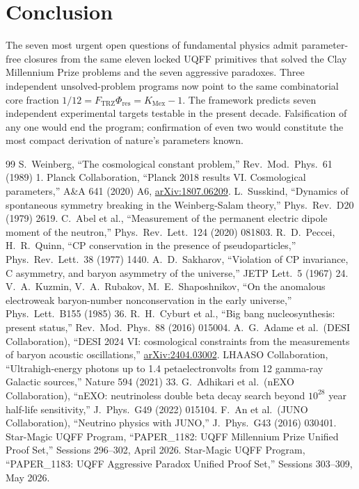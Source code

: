 \documentclass[11pt]{article}
\newcommand{\Ftrz}{F_{\mathrm{TRZ}}}
\newcommand{\Phires}{\Phi_{\mathrm{res}}}
\newcommand{\KMex}{K_{\mathrm{Mex}}}
\begin{document}
\section{Conclusion}

The seven most urgent open questions of fundamental physics admit
parameter-free closures from the same eleven locked UQFF primitives
that solved the Clay Millennium Prize problems and the seven
aggressive paradoxes. Three independent unsolved-problem programs
now point to the same combinatorial core fraction $1/12=\Ftrz\Phires=\KMex-1$.
The framework predicts seven independent experimental targets
testable in the present decade. Falsification of any one would end
the program; confirmation of even two would constitute the most
compact derivation of nature's parameters known.

\begin{thebibliography}{99}
 S.\ Weinberg, ``The cosmological constant problem,'' Rev.\ Mod.\ Phys.\ 61 (1989) 1.
 Planck Collaboration, ``Planck 2018 results VI. Cosmological parameters,'' A\&A 641 (2020) A6, \href{https://arxiv.org/abs/1807.06209}{arXiv:1807.06209}.
 L.\ Susskind, ``Dynamics of spontaneous symmetry breaking in the Weinberg-Salam theory,'' Phys.\ Rev.\ D20 (1979) 2619.
 C.\ Abel et al., ``Measurement of the permanent electric dipole moment of the neutron,'' Phys.\ Rev.\ Lett.\ 124 (2020) 081803.
 R.~D.~Peccei, H.~R.~Quinn, ``CP conservation in the presence of pseudoparticles,'' Phys.\ Rev.\ Lett.\ 38 (1977) 1440.
 A.\ D.\ Sakharov, ``Violation of CP invariance, C asymmetry, and baryon asymmetry of the universe,'' JETP Lett.\ 5 (1967) 24.
 V.~A.~Kuzmin, V.~A.~Rubakov, M.~E.~Shaposhnikov, ``On the anomalous electroweak baryon-number nonconservation in the early universe,'' Phys.\ Lett.\ B155 (1985) 36.
 R.~H.~Cyburt et al., ``Big bang nucleosynthesis: present status,'' Rev.\ Mod.\ Phys.\ 88 (2016) 015004.
 A.~G.~Adame et al.\ (DESI Collaboration), ``DESI 2024 VI: cosmological constraints from the measurements of baryon acoustic oscillations,'' \href{https://arxiv.org/abs/2404.03002}{arXiv:2404.03002}.
 LHAASO Collaboration, ``Ultrahigh-energy photons up to 1.4 petaelectronvolts from 12 gamma-ray Galactic sources,'' Nature 594 (2021) 33.
 G.\ Adhikari et al.\ (nEXO Collaboration), ``nEXO: neutrinoless double beta decay search beyond $10^{28}$ year half-life sensitivity,'' J.\ Phys.\ G49 (2022) 015104.
 F.\ An et al.\ (JUNO Collaboration), ``Neutrino physics with JUNO,'' J.\ Phys.\ G43 (2016) 030401.
 Star-Magic UQFF Program, ``PAPER\_1182: UQFF Millennium Prize Unified Proof Set,'' Sessions 296--302, April 2026.
 Star-Magic UQFF Program, ``PAPER\_1183: UQFF Aggressive Paradox Unified Proof Set,'' Sessions 303--309, May 2026.
\end{thebibliography}
\end{document}
